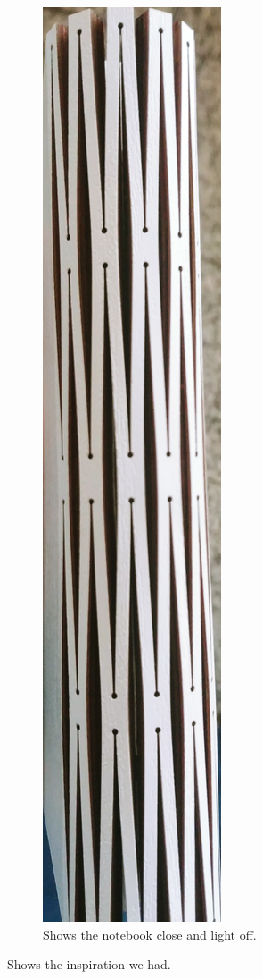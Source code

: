 \documentclass[04_projectProcess.tex]{subfiles}
\begin{document}
\begin{flushleft}
\begin{figure}[H]
\begin{subfigure}{.45\textwidth}
                    \includegraphics[scale=0.03, angle=90]{images/projectideas/inspiration_off.jpg}
                    \caption{Shows the notebook close and light off.}
                    \label{fig:inspirationLightOff}
                    \vspace{6mm}
                \end{subfigure}
                \caption{Shows the inspiration we had.}
                \label{fig:inspiration}
            \end{figure}
        \end{flushleft}
\end{document}
